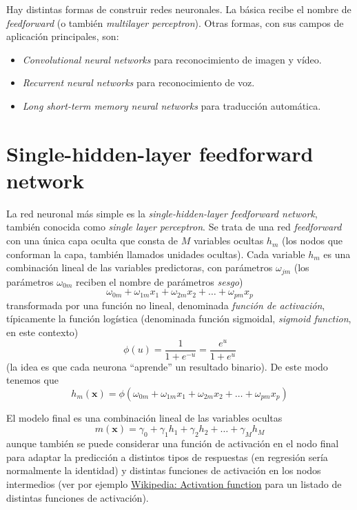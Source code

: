 \documentclass[
  spanish,
]{book}
\theoremstyle{break}
\theoremstyle{definition}
\theoremstyle{definition}
\theoremstyle{definition}
\theoremstyle{definition}
\theoremstyle{remark}
\begin{document}
Hay distintas formas de construir redes neuronales. La básica recibe el nombre de \emph{feedforward} (o también \emph{multilayer perceptron}). Otras formas, con sus campos de aplicación principales, son:

\begin{itemize}
\item
  \emph{Convolutional neural networks} para reconocimiento de imagen y vídeo.
\item
  \emph{Recurrent neural networks} para reconocimiento de voz.
\item
  \emph{Long short-term memory neural networks} para traducción automática.
\end{itemize}

\hypertarget{single-hidden-layer-feedforward-network}{%
\section{Single-hidden-layer feedforward network}\label{single-hidden-layer-feedforward-network}}

La red neuronal más simple es la \emph{single-hidden-layer feedforward network}, también conocida como \emph{single layer perceptron}. Se trata de una red \emph{feedforward} con una única capa oculta que consta de \(M\) variables ocultas \(h_m\) (los nodos que conforman la capa, también llamados unidades ocultas). Cada variable \(h_m\) es una combinación lineal de las variables predictoras, con parámetros \(\omega_{jm}\) (los parámetros \(\omega_{0m}\) reciben el nombre de parámetros \emph{sesgo})
\[\omega_{0m} + \omega_{1m} x_1 + \omega_{2m} x_2 + \ldots + \omega_{pm} x_p\]
transformada por una función no lineal, denominada \emph{función de activación}, típicamente la función logística (denominada función sigmoidal, \emph{sigmoid function}, en este contexto)
\[\phi(u) = \frac{1}{1 + e^{-u}} = \frac{e^u}{1 + e^u}\]
(la idea es que cada neurona ``aprende'' un resultado binario).
De este modo tenemos que
\[h_{m}(\mathbf{x}) = \phi\left( \omega_{0m} + \omega_{1m} x_1 + \omega_{2m} x_2 + \ldots + \omega_{pm} x_p \right)\]

El modelo final es una combinación lineal de las variables ocultas
\[m(\mathbf{x}) = \gamma_0 + \gamma_1 h_1 + \gamma_2 h_2 + \ldots + \gamma_M h_M\]
aunque también se puede considerar una función de activación en el nodo final para adaptar la predicción a distintos tipos de respuestas (en regresión sería normalmente la identidad) y distintas funciones de activación en los nodos intermedios (ver por ejemplo \href{https://en.wikipedia.org/wiki/Activation_function}{Wikipedia: Activation function} para un listado de distintas funciones de activación).
\end{document}
